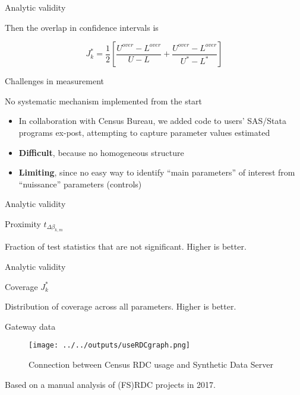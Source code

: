 \begin{frame}{Analytic validity}
	\begin{block}{	Then the  overlap in confidence intervals is}

	
	$$
	J_k^{*} = \frac{1}{2} \left [ \frac{U^{over} - L^{over}}{U-L} + \frac{U^{over} - L^{over}}{U^*-L ^*}        \right ]
	$$
\end{block}
\end{frame}

\begin{frame}{Challenges in measurement}
	\begin{block}{No systematic mechanism implemented from the start}
		\begin{itemize}
			\item In collaboration with Census Bureau, we added code to users' SAS/Stata programs ex-post, attempting to capture parameter values estimated
			\item \textbf{Difficult}, because no homogeneous structure 
			\item \textbf{Limiting}, since no easy way to identify ``main parameters'' of interest from ``nuissance'' parameters (controls)
		\end{itemize}
	\end{block}
\end{frame}

\begin{frame}{Analytic validity}
	\begin{block}{Proximity $
			t_{\Delta \beta_{k,m}}$}
		\centering
		
	\end{block}
\footnotesize Fraction of test statistics that are not significant. Higher is better.
\end{frame}

\begin{frame}{Analytic validity}
\begin{block}{Coverage $J_k^{*}$}
	\centering

\end{block}
\footnotesize Distribution of coverage across all parameters. Higher is better.
\end{frame}

	
	

\begin{frame}{Gateway data}
\begin{figure}
	\centering
	\caption{Connection between Census RDC usage and Synthetic Data Server}\label{fig:rdcUse}
	\texttt{[image: ../../outputs/useRDCgraph.png]}
\end{figure}
\footnotesize Based on a manual analysis of (FS)RDC projects in 2017.
\end{frame}
 

